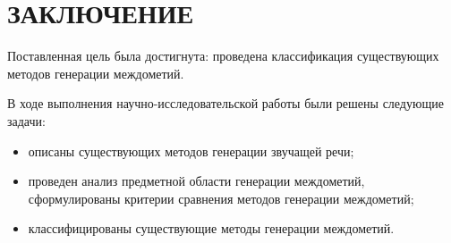 \chapter*{\hfill ЗАКЛЮЧЕНИЕ \hfill}

Поставленная цель была достигнута: проведена классификация существующих методов генерации междометий.

В ходе выполнения научно-исследовательской работы были решены следующие задачи:

\begin{itemize}[label=---]
	\item описаны существующих методов генерации звучащей речи;
	\item проведен анализ предметной области генерации междометий, сформулированы критерии сравнения методов генерации междометий;
	\item классифицированы существующие методы генерации междометий.
\end{itemize}

